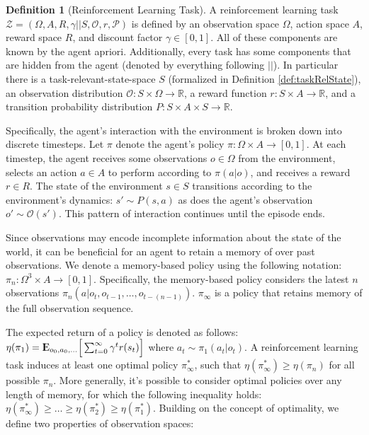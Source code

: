 \documentclass{article} %
\newcommand{\Expect}{{\rm I\kern-.3em E}}
\theoremstyle{definition}
\newtheorem{definition}{Definition}[section]
\begin{document}
\begin{definition}[Reinforcement Learning Task]
\label{def:markov}
A reinforcement learning task $\mathcal{Z} = (\Omega, A, R, \gamma ||
S, \mathcal{O}, r, \mathcal{P})$ is defined by an observation space
$\Omega$, action space $A$, reward space $R$, and discount factor
$\gamma \in [0,1]$. All of these components are known by the agent
apriori. Additionally, every task has some components that are hidden
from the agent (denoted by everything following $||$). In particular
there is a task-relevant-state-space $S$ (formalized in Definition
\ref{def:taskRelState}), an observation distribution $\mathcal{O}: S
\times \Omega \rightarrow \mathbb{R}$, a reward function $r : S \times
A \rightarrow \mathbb{R}$, and a transition probability distribution
$P : S \times A \times S \rightarrow \mathbb{R}$.

Specifically, the agent's interaction with the environment is broken
down into discrete timesteps. Let $\pi$ denote the agent's policy $\pi
: \Omega \times A \rightarrow [0,1]$. At each timestep, the agent receives
some observations $o \in \Omega$ from the environment, selects an
action $a \in A$ to perform according to $\pi(a | o)$, and receives a
reward $r \in R$. The state of the environment $s \in S$ transitions
according to the environment's dynamics: $s' \sim P(s,a)$ as does the
agent's observation $o' \sim \mathcal{O}(s')$. This pattern of
interaction continues until the episode ends.
\end{definition}

Since observations may encode incomplete information about the state
of the world, it can be beneficial for an agent to retain a memory of
over past observations. We denote a memory-based policy using the
following notation: $\pi_n : \Omega^3 \times A \rightarrow
[0,1]$. Specifically, the memory-based policy considers the latest $n$
observations $\pi_n(a|o_t, o_{t-1}, \dots, o_{t-(n-1)})$. $\pi_\infty$
is a policy that retains memory of the full observation sequence.

The expected return of a policy is denoted as follows: $\eta(\pi_1) =
\Expect_{o_0, a_0, \dots} \Big [ \sum_{t=0}^\infty \gamma^t r(s_t)
  \Big ]$ where $a_t \sim \pi_1(a_t|o_t)$. A reinforcement learning
task induces at least one optimal policy $\pi^*_\infty$, such that
$\eta(\pi^*_\infty) \ge \eta(\pi_n)$ for all possible $\pi_n$. More
generally, it's possible to consider optimal policies over any length
of memory, for which the following inequality holds:
$\eta(\pi^*_\infty) \ge \dots \ge \eta(\pi^*_2) \ge
\eta(\pi^*_1)$. Building on the concept of optimality, we define two
properties of observation spaces:
\end{document}
